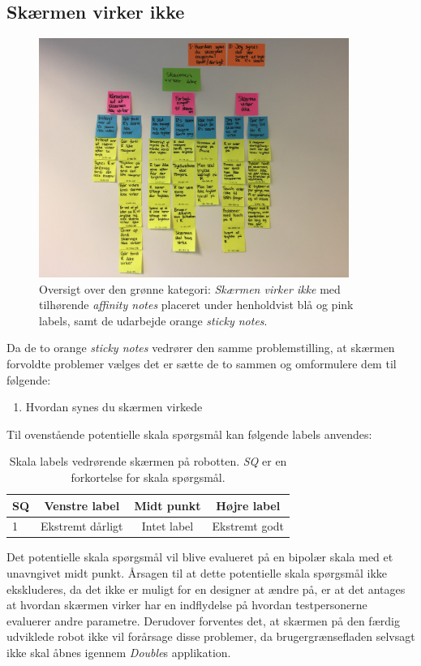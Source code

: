 \subsection{Skærmen virker ikke}
\label{ParametreSkaermenVirkerIkke}
%
\begin{figure}[H]
\centering
\includegraphics[width = 0.9\textwidth]{Figure/AffinityDiagram/SkaermenVirkerIkke} 
\caption{Oversigt over den grønne kategori: \textit{Skærmen virker ikke} med tilhørende \textit{affinity notes} placeret under henholdvist blå og pink labels, samt de udarbejde orange \textit{sticky notes}.}
\label{fig:AFSkaermVirkerIkke}
\end{figure}
\noindent
%
Da de to orange \textit{sticky notes} vedrører den samme problemstilling, at skærmen forvoldte problemer vælges det er sætte de to sammen og omformulere dem til følgende:\blankline
%
\begin{enumerate}
  \item Hvordan synes du skærmen virkede\blankline
\end{enumerate}
%
Til ovenstående potentielle skala spørgsmål kan følgende labels anvendes:
%
\begin{table}[H]
	\centering 
	\begin{tabular}{l|c|c|c}
		SQ     & Venstre label & Midt punkt & Højre label \\\hline
		1   & Ekstremt dårligt & Intet label & Ekstremt godt                 
	\end{tabular}
\caption{Skala labels vedrørende skærmen på robotten. \textit{SQ} er en forkortelse for skala spørgsmål.}
	\label{tab:SkaermenR}
\end{table}
\noindent
%
Det potentielle skala spørgsmål vil blive evalueret på en bipolær skala med et unavngivet midt punkt. Årsagen til at dette potentielle skala spørgsmål ikke ekskluderes, da det ikke er muligt for en designer at ændre på, er at det antages at hvordan skærmen virker har en indflydelse på hvordan testpersonerne evaluerer andre parametre. Derudover forventes det, at skærmen på den færdig udviklede robot ikke vil forårsage disse problemer, da brugergrænsefladen selvsagt ikke skal åbnes igennem \textit{Double}s applikation. 
\newpage
%
